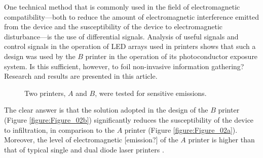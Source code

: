 \documentclass[10pt,a4paper]{article}
\begin{document}
One technical method that is commonly used in the field of electromagnetic
compatibility---both to reduce the amount of electromagnetic interference
emitted from the device and the susceptibility of the device to
electromagnetic disturbance---is the use of differential signals. Analysis
of useful signals and control signals \cite{Kubiak2017d} in the operation of
LED arrays
used in printers shows that such a design was used by the $B$ printer in the
operation of its photoconductor exposure system. Is this sufficient, however,
to foil non-invasive information gathering? Research and results are
presented in this article.

\begin{figure*}[!t]
    \centering
    \hfil
    \caption{Two printers, $A$ and $B$, were tested for sensitive emissions.}
    \label{figure:Figure_02}
\end{figure*}

The clear answer is that the solution adopted in the design of the $B$
printer (Figure \ref{figure:Figure_02b}) significantly reduces the
susceptibility of the device to infiltration, in comparison to the $A$
printer (Figure \ref{figure:Figure_02a}). Moreover, the level of
electromagnetic [emission?] of the $A$ printer is higher than that of
typical single and dual diode laser printers \cite{Kubiak2014b}.


\singlespacing



\end{document}

